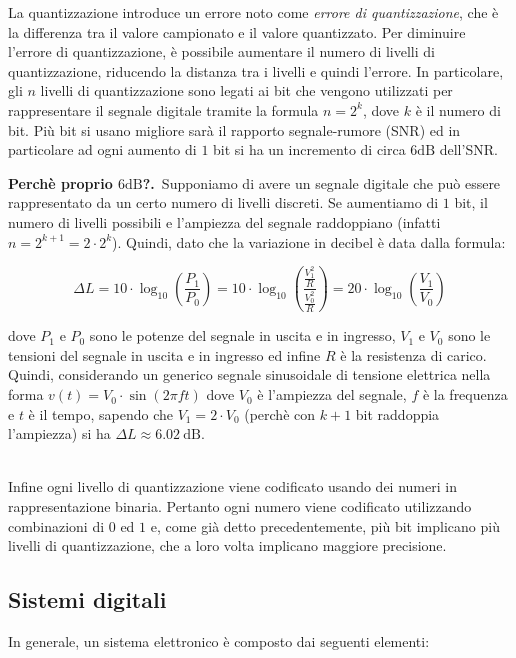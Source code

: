 \documentclass[a4paper,12pt]{report}  %
\newcommand{\namedparagraph}[2]{%
    \noindent\colorbox{cyan!20}{\parbox{\dimexpr\linewidth-2\fboxsep}{\textbf{#1}~#2}}%
}
\begin{document}
La quantizzazione introduce un errore noto come \textit{errore di quantizzazione}, che è la differenza tra il valore campionato e il valore quantizzato.
Per diminuire l'errore di quantizzazione, è possibile aumentare il numero di livelli di quantizzazione, riducendo la distanza tra i livelli e quindi l'errore.
In particolare, gli $n$ livelli di quantizzazione sono legati ai bit che vengono utilizzati per rappresentare il segnale digitale tramite la formula $n = 2^k$, dove $k$ è il numero di bit.
Più bit si usano migliore sarà il rapporto segnale-rumore (SNR) ed in particolare ad ogni aumento di $1$ bit si ha un incremento di circa $6 \text{dB}$ dell'SNR.

\namedparagraph{Perchè proprio $6 \text{dB}$?.}{Supponiamo di avere un segnale digitale che può essere rappresentato da un certo numero di livelli discreti.
Se aumentiamo di $1$ bit, il numero di livelli possibili e l'ampiezza del segnale raddoppiano (infatti $n = 2^{k + 1} = 2 \cdot 2^k$).
Quindi, dato che la variazione in decibel è data dalla formula:

\begin{equation}
    \Delta L = 10 \cdot \log_{10} \left( \frac{P_1}{P_0} \right) = 10 \cdot \log_{10} \left( \frac{\frac{V_1^2}{R}}{\frac{V_0^2}{R}} \right) = 20 \cdot \log_{10} \left( \frac{V_1}{V_0} \right) \nonumber
\end{equation}

dove $P_1$ e $P_0$ sono le potenze del segnale in uscita e in ingresso, $V_1$ e $V_0$ sono le tensioni del segnale in uscita e in ingresso ed infine $R$ è la resistenza di carico.
Quindi, considerando un generico segnale sinusoidale di tensione elettrica nella forma $v(t) = V_0 \cdot \sin(2 \pi f t)$ dove $V_0$ è l'ampiezza del segnale, $f$ è la frequenza e $t$ è il tempo, sapendo che $V_1 = 2 \cdot V_0$ (perchè con $k + 1$ bit raddoppia l'ampiezza) si ha $\Delta L \approx 6.02 \ \text{dB}$.}

\noindent\\ Infine ogni livello di quantizzazione viene codificato usando dei numeri in rappresentazione binaria.
Pertanto ogni numero viene codificato utilizzando combinazioni di $0$ ed $1$ e, come già detto precedentemente, più bit implicano più livelli di quantizzazione, che a loro volta implicano maggiore precisione.

\subsection{Sistemi digitali}
In generale, un sistema elettronico è composto dai seguenti elementi:
\end{document}
